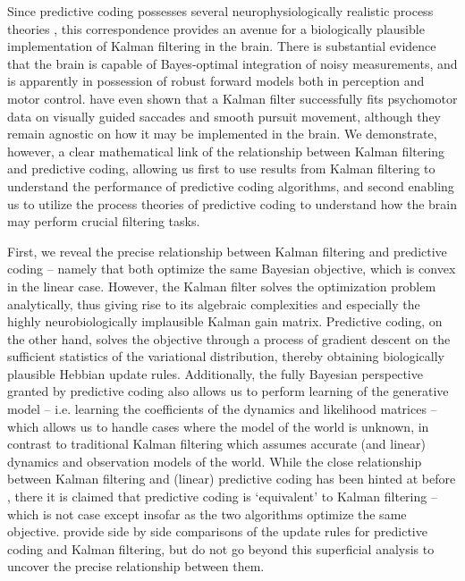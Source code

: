 Since predictive coding possesses several neurophysiologically realistic process theories \citep{bastos2012canonical}, this correspondence provides an avenue for a biologically plausible implementation of Kalman filtering in the brain. There is substantial evidence that the brain is capable of Bayes-optimal integration of noisy measurements, and is apparently in possession of robust forward models both in perception \citep*{zago2008internal,simoncelli2009optimal} and motor control\citep*{munuera2009optimal, gold2003influence,todorov2004optimality}. \citet*{de2013kalman} have even shown that a Kalman filter successfully fits psychomotor data on visually guided saccades and smooth pursuit movement, although they remain agnostic on how it may be implemented in the brain. We demonstrate, however, a clear mathematical link of the relationship between Kalman filtering and predictive coding, allowing us first to use results from Kalman filtering to understand the performance of predictive coding algorithms, and second enabling us to utilize the process theories of predictive coding to understand how the brain may perform crucial filtering tasks.

First, we reveal the precise relationship between Kalman filtering and predictive coding -- namely that both optimize the same Bayesian objective, which is convex in the linear case. However, the Kalman filter solves the optimization problem analytically, thus giving rise to its algebraic complexities and especially the highly neurobiologically implausible Kalman gain matrix. Predictive coding, on the other hand, solves the objective through a process of gradient descent on the sufficient statistics of the variational distribution, thereby obtaining biologically plausible Hebbian update rules. Additionally, the fully Bayesian perspective granted by predictive coding also allows us to perform learning of the generative model -- i.e. learning the coefficients of the dynamics and likelihood matrices -- which allows us to handle cases where the model of the world is unknown, in contrast to traditional Kalman filtering which assumes accurate (and linear) dynamics and observation models of the world. While the close relationship between Kalman filtering and (linear) predictive coding has been hinted at before \citep{friston2005theory,friston2008hierarchical}, there it is claimed that predictive coding is `equivalent' to Kalman filtering -- which is not case except insofar as the two algorithms optimize the same objective. \citet{baltieri2020kalman} provide side by side comparisons of the update rules for predictive coding and Kalman filtering, but do not go beyond this superficial analysis to uncover the precise relationship between them. 

